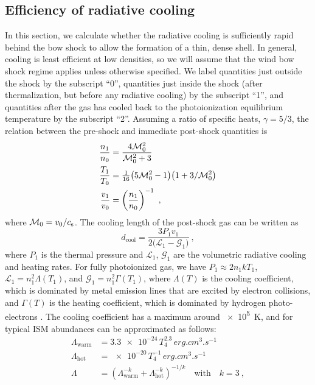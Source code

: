 \subsection{Efficiency of radiative cooling}
\label{sec:radi-cool-lengths}
%
In this section, we calculate whether the radiative cooling is
sufficiently rapid behind the bow shock to allow the formation of a
thin, dense shell.  In general, cooling is least efficient at low
densities, so we will assume that the wind bow shock regime applies
unless otherwise specified. We label quantities just outside the shock
by the subscript ``0'', quantities just inside the shock (after
thermalization, but before any radiative cooling) by the subscript
``1'', and quantities after the gas has cooled back to the
photoionization equilibrium temperature by the subscript ``2''.
Assuming a ratio of specific heats, \(\gamma = 5/3\), the relation between
the pre-shock and immediate post-shock quantities is
\begin{align}
  \label{eq:shock-n-jump}
  \frac{n_1}{n_0} &= \frac{4 \mathcal{M}_0^2} {\mathcal{M}_0^2 + 3} \\
  \label{eq:shock-T-jump}
  \frac{T_1}{T_0} &= \tfrac1{16} \bigl( 5\mathcal{M}_0^2 - 1 \bigr) \bigl( 1 + 3/\mathcal{M}_0^2 \bigr) \\
  \label{eq:shock-v-jump}
  \frac{v_1}{v_0} &= \left(\frac{n_1}{n_0}\right)^{-1} \ ,
\end{align}
where \(\mathcal{M}_0 = v_0 / c_{\text{s}}\).  The cooling length of the post-shock
gas can be written as
\newcommand\cool{\ensuremath{_{\text{cool}}}}
\begin{equation}
  \label{eq:dcool}
  d\cool = \frac{3 P_1 v_1} { 2 \bigl(  \mathcal{L}_1 - \mathcal{G}_1 \bigr) }\ ,  
\end{equation}
where \(P_1\) is the thermal pressure and \(\mathcal{L}_1\),
\(\mathcal{G}_1\) are the volumetric radiative cooling and heating
rates.  For fully photoionized gas, we have
\(P_1 \approx 2 n_1 k T_1\), \(\mathcal{L}_1 = n_1^2 \Lambda(T_1)\), and
\(\mathcal{G}_1 = n_1^2 \Gamma(T_1)\), where \(\Lambda(T)\) is the cooling
coefficient, which is dominated by metal emission lines that are
excited by electron collisions, and \(\Gamma(T)\) is the heating
coefficient, which is dominated by hydrogen photo-electrons
\citep{Osterbrock:2006a}. The cooling coefficient has a maximum around
\SI{e5}{K}, and for typical ISM abundances can be approximated as
follows:
\begin{align}
  \label{eq:cooling-coefficient}
  \Lambda_{\text{warm}} &= \num{3.3e-24} \, T_4^{2.3} \, \si{erg.cm^{3}.s^{-1}}\\
  \Lambda_{\text{hot}} &= \num{e-20} \, T_4^{-1}\, \si{erg.cm^{3}.s^{-1}} \\
  \Lambda &= \left( \Lambda_{\text{warm}}^{-k} +  \Lambda_{\text{hot}}^{-k} \right)^{-1/k}
      \quad \text{with} \quad k = 3 \ ,
\end{align}
